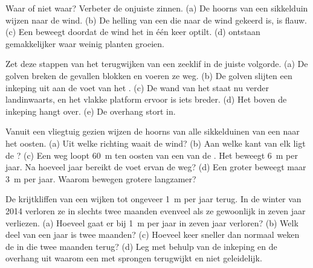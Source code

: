 \begin{exercise}[$\star$]\label{exo:g9:landforms:3}
Waar of niet waar? Verbeter de onjuiste zinnen. (a) De hoorns van een
sikkelduin wijzen naar de wind. (b) De helling van een  die naar de
wind gekeerd is, is flauw. (c) Een  beweegt doordat de wind het in één
keer optilt. (d)  ontstaan gemakkelijker waar weinig planten groeien.
\end{exercise}

\begin{exercise}[$\star$]\label{exo:g9:landforms:4}
Zet deze stappen van het terugwijken van een zeeklif in de juiste volgorde.
(a) De golven breken de gevallen blokken en voeren ze weg. (b) De golven
slijten een inkeping uit aan de voet van het . (c) De wand van het 
staat nu verder landinwaarts, en het vlakke platform ervoor is iets breder.
(d) Het  boven de inkeping hangt over. (e) De overhang stort in.
\end{exercise}

\begin{exercise}[$\star\star$]\label{exo:g9:landforms:5}
Vanuit een vliegtuig gezien wijzen de hoorns van alle sikkelduinen van een
 naar het oosten. (a) Uit welke richting waait de wind? (b) Aan
welke kant van elk  ligt de ? (c) Een weg loopt \qty{60}{m} ten
oosten van een van de . Het  beweegt \qty{6}{m} per jaar. Na
hoeveel jaar bereikt de voet ervan de weg? (d) Een groter  beweegt
maar \qty{3}{m} per jaar. Waarom bewegen grotere  langzamer?
\end{exercise}

\begin{exercise}[$\star\star$]\label{exo:g9:landforms:6}
De krijtkliffen van een  wijken tot ongeveer \qty{1}{m} per jaar terug.
In de winter van 2014 verloren ze in slechts twee maanden evenveel als ze
gewoonlijk in zeven jaar verliezen. (a) Hoeveel gaat er bij \qty{1}{m} per
jaar in zeven jaar verloren? (b) Welk deel van een jaar is twee maanden?
(c) Hoeveel keer sneller dan normaal weken de  in die twee maanden
terug? (d) Leg met behulp van de inkeping en de overhang uit waarom een
 met sprongen terugwijkt en niet geleidelijk.
\end{exercise}

